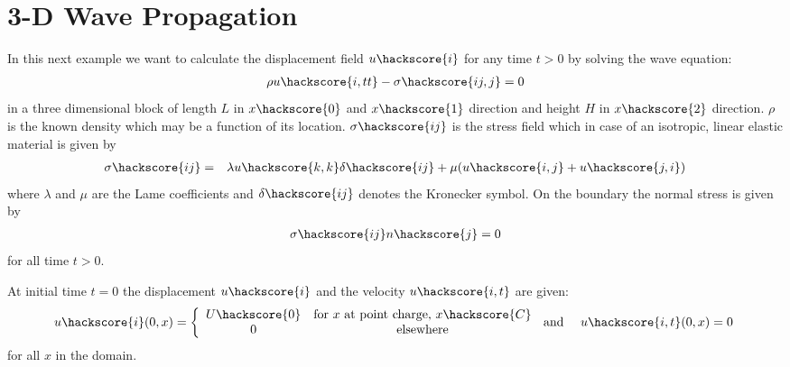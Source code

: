 
%
%
%


\section{3-D Wave Propagation}
\label{WAVE CHAP}

In this next example we want to calculate the displacement field $u\hackscore{i}$ for any time $t>0$ by solving the wave equation:
\begin{eqnarray}\label{WAVE general problem}
\rho u\hackscore{i,tt} - \sigma\hackscore{ij,j}=0
\end{eqnarray}
in a three dimensional block of length $L$ in $x\hackscore{0}$
and $x\hackscore{1}$ direction and height $H$
in $x\hackscore{2}$ direction. $\rho$ is the known density which may be a function of its location.
$\sigma\hackscore{ij}$ is the stress field  which in case of an isotropic, linear elastic material is given by
\begin{eqnarray} \label{WAVE stress}
\sigma\hackscore{ij} & = & \lambda u\hackscore{k,k} \delta\hackscore{ij} + \mu ( u\hackscore{i,j} + u\hackscore{j,i})
\end{eqnarray}
where $\lambda$ and $\mu$ are the Lame coefficients 
 and $\delta\hackscore{ij}$ denotes the Kronecker symbol.
On the boundary the normal stress is given by
\begin{eqnarray} \label{WAVE natural}
\sigma\hackscore{ij}n\hackscore{j}=0
\end{eqnarray}
for all time $t>0$. 

At initial time $t=0$ the displacement 
$u\hackscore{i}$ and the velocity $u\hackscore{i,t}$ are given:
\begin{eqnarray} \label{WAVE initial}
u\hackscore{i}(0,x)= \left\{\begin{array}{cc} U\hackscore{0} & \mbox{for $x$ at point charge, $x\hackscore{C}$} \\ 0 & \mbox{elsewhere}\end{array}  \right. & \mbox{ and } & u\hackscore{i,t}(0,x)=0 \; 
\end{eqnarray}
for all $x$ in the domain. 

